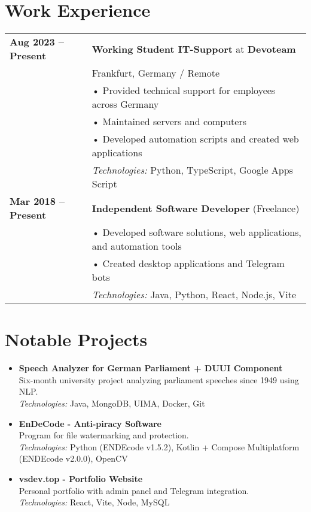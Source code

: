\documentclass[11pt,a4paper]{article}
\begin{document}
\section*{Work Experience}
\begin{tabularx}{\textwidth}{@{}l X@{}}
\textbf{Aug 2023 -- Present} & \textbf{Working Student IT-Support} at \textbf{Devoteam}\\
& Frankfurt, Germany / Remote\\[0.3em]
& • Provided technical support for employees across Germany\\
& • Maintained servers and computers\\
& • Developed automation scripts and created web applications\\[0.3em]
& \textit{Technologies:} Python, TypeScript, Google Apps Script\\[0.8em]

\textbf{Mar 2018 -- Present} & \textbf{Independent Software Developer} (Freelance)\\[0.3em]
& • Developed software solutions, web applications, and automation tools\\
& • Created desktop applications and Telegram bots\\[0.3em]
& \textit{Technologies:} Java, Python, React, Node.js, Vite
\end{tabularx}

\section*{Notable Projects}
\begin{itemize}[leftmargin=*, itemsep=0.8em]
    \item \textbf{Speech Analyzer for German Parliament + DUUI Component}\\
    Six-month university project analyzing parliament speeches since 1949 using NLP.\\
    \textit{Technologies:} Java, MongoDB, UIMA, Docker, Git
    
    \item \textbf{EnDeCode - Anti-piracy Software}\\
    Program for file watermarking and protection.\\
    \textit{Technologies:} Python (ENDEcode v1.5.2), Kotlin + Compose Multiplatform (ENDEcode v2.0.0), OpenCV
    
    \item \textbf{vsdev.top - Portfolio Website}\\
    Personal portfolio with admin panel and Telegram integration.\\
    \textit{Technologies:} React, Vite, Node, MySQL
\end{itemize}
\end{document}
